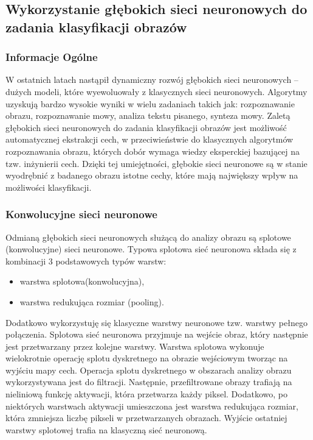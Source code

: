 \subsection{Wykorzystanie głębokich sieci neuronowych do zadania klasyfikacji obrazów}

\subsubsection{Informacje Ogólne}

W ostatnich latach nastąpił dynamiczny rozwój głębokich sieci neuronowych – dużych modeli, które wyewoluowały z klasycznych sieci neuronowych. Algorytmy uzyskują bardzo wysokie wyniki w wielu zadaniach takich jak: rozpoznawanie obrazu, rozpoznawanie mowy, analiza tekstu pisanego, synteza mowy. Zaletą głębokich sieci neuronowych do zadania klasyfikacji obrazów jest możliwość automatycznej ekstrakcji cech, w przeciwieństwie do klasycznych algorytmów rozpoznawania obrazu, których dobór wymaga wiedzy eksperckiej bazującej na tzw. inżynierii cech. Dzięki tej umiejętności, głębokie sieci neuronowe są w stanie wyodrębnić z badanego obrazu istotne cechy, które mają największy wpływ na możliwości klasyfikacji. 

\subsubsection{Konwolucyjne sieci neuronowe}

Odmianą głębokich sieci neuronowych służącą do analizy obrazu są splotowe (konwolucyjne) sieci neuronowe. Typowa splotowa sieć neuronowa składa się z kombinacji 3 podstawowych typów warstw: 
\begin{itemize}	
	\item warstwa splotowa(konwolucyjna), 
	\item warstwa redukująca rozmiar (pooling). \\
\end{itemize}	

Dodatkowo wykorzystuję się klasyczne warstwy neuronowe tzw. warstwy pełnego połączenia. Splotowa sieć neuronowa przyjmuje na wejście obraz, który następnie jest przetwarzany przez kolejne warstwy. Warstwa splotowa wykonuje wielokrotnie operację splotu dyskretnego na obrazie wejściowym tworząc na wyjściu mapy cech. Operacja splotu dyskretnego w obszarach analizy obrazu wykorzystywana jest do filtracji. Następnie, przefiltrowane obrazy trafiają na nieliniową funkcję aktywacji, która przetwarza każdy piksel. Dodatkowo, po niektórych warstwach aktywacji umieszczona jest warstwa redukująca rozmiar, która zmniejsza liczbę pikseli w przetwarzanych obrazach. Wyjście ostatniej warstwy splotowej trafia na klasyczną sieć neuronową. \\

